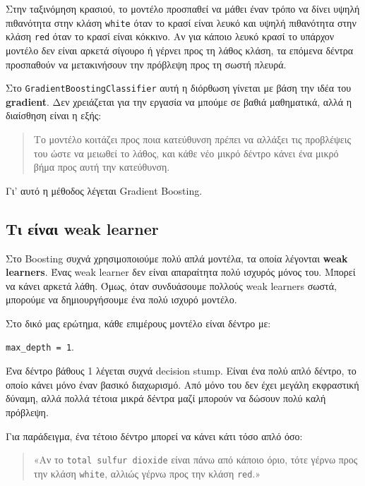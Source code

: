 \documentclass[12pt,a4paper]{article}
\newcommand{\code}[1]{\texttt{\textenglish{#1}}}
\begin{document}
Στην ταξινόμηση κρασιού, το μοντέλο προσπαθεί να μάθει έναν τρόπο να δίνει
υψηλή πιθανότητα στην κλάση \code{white} όταν το κρασί είναι λευκό και υψηλή
πιθανότητα στην κλάση \code{red} όταν το κρασί είναι κόκκινο. Αν για κάποιο
λευκό κρασί το υπάρχον μοντέλο δεν είναι αρκετά σίγουρο ή γέρνει προς τη λάθος
κλάση, τα επόμενα δέντρα προσπαθούν να μετακινήσουν την πρόβλεψη προς τη σωστή
πλευρά.

Στο \code{GradientBoostingClassifier} αυτή η διόρθωση γίνεται με βάση την ιδέα
του \textbf{gradient}. Δεν χρειάζεται για την εργασία να μπούμε σε βαθιά
μαθηματικά, αλλά η διαίσθηση είναι η εξής:

\begin{quote}
Το μοντέλο κοιτάζει προς ποια κατεύθυνση πρέπει να αλλάξει τις προβλέψεις του
ώστε να μειωθεί το λάθος, και κάθε νέο μικρό δέντρο κάνει ένα μικρό βήμα προς
αυτή την κατεύθυνση.
\end{quote}

Γι' αυτό η μέθοδος λέγεται \textenglish{Gradient Boosting}.

\subsection{Τι είναι weak learner}

Στο Boosting συχνά χρησιμοποιούμε πολύ απλά μοντέλα, τα οποία λέγονται
\textbf{weak learners}. Ένας weak learner δεν είναι απαραίτητα πολύ ισχυρός
μόνος του. Μπορεί να κάνει αρκετά λάθη. Όμως, όταν συνδυάσουμε πολλούς weak
learners σωστά, μπορούμε να δημιουργήσουμε ένα πολύ ισχυρό μοντέλο.

Στο δικό μας ερώτημα, κάθε επιμέρους μοντέλο είναι δέντρο με:

\begin{center}
\code{max\_depth = 1}.
\end{center}

Ένα δέντρο βάθους 1 λέγεται συχνά \textenglish{decision stump}. Είναι ένα πολύ
απλό δέντρο, το οποίο κάνει μόνο έναν βασικό διαχωρισμό. Από μόνο του δεν έχει
μεγάλη εκφραστική δύναμη, αλλά πολλά τέτοια μικρά δέντρα μαζί μπορούν να
δώσουν πολύ καλή πρόβλεψη.

Για παράδειγμα, ένα τέτοιο δέντρο μπορεί να κάνει κάτι τόσο απλό όσο:

\begin{quote}
«Αν το \code{total sulfur dioxide} είναι πάνω από κάποιο όριο, τότε γέρνω προς
την κλάση \code{white}, αλλιώς γέρνω προς την κλάση \code{red}.»
\end{quote}
\end{document}
